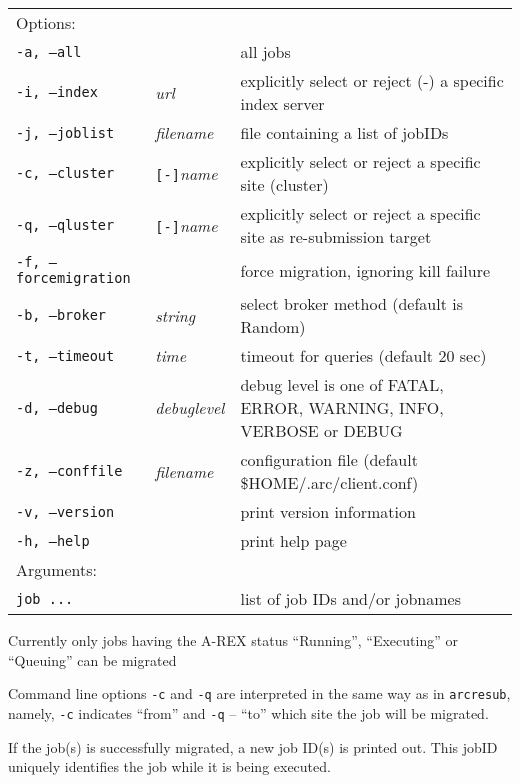 \hspace*{0.5cm}
\begin{shaded}
\end{shaded}
\begin{longtable}{llp{8cm}}
   Options:&&\\
   \texttt{-a, --all}& & all jobs\\
   \texttt{-i, --index}&\textit{url}&explicitly select or reject (-) a specific index server\\
   \texttt{-j, --joblist}& \textit{filename} & file containing a list of jobIDs\\
   \texttt{-c, --cluster}&\verb#[-]#\textit{name}&explicitly select or reject a specific site (cluster)\\
   \texttt{-q, --qluster}&\verb#[-]#\textit{name}&explicitly select or reject a specific site as re-submission target\\
   \texttt{-f, --forcemigration}& & force migration, ignoring kill failure\\
   \texttt{-b, --broker}&\textit{string}&select broker method (default is Random)\\
   \texttt{-t, --timeout}& \textit{time} & timeout for queries (default 20 sec)\\
   \texttt{-d, --debug}& \textit{debuglevel}&debug level is one of  FATAL, ERROR, WARNING, INFO, VERBOSE or DEBUG\\
   \texttt{-z, --conffile}&\textit{filename}& configuration file (default {\$}HOME/.arc/client.conf)\\
   \texttt{-v, --version}& & print version information\\
   \texttt{-h, --help}& & print help page\\
   Arguments:&&\\
   \texttt{job ...} && list of job IDs and/or jobnames\\
\end{longtable}

\begin{framed}
Currently only jobs having the A-REX status ``Running'', ``Executing'' or ``Queuing'' can be migrated
\end{framed}

Command line options \verb#-c# and \verb #-q# are interpreted in the same way as in \verb#arcresub#, namely, 
\verb#-c# indicates ``from'' and \verb #-q# -- ``to'' which site the job will be migrated.

If the job(s) is successfully migrated, a new job ID(s) is printed out. This jobID uniquely 
identifies the job while it is being executed.